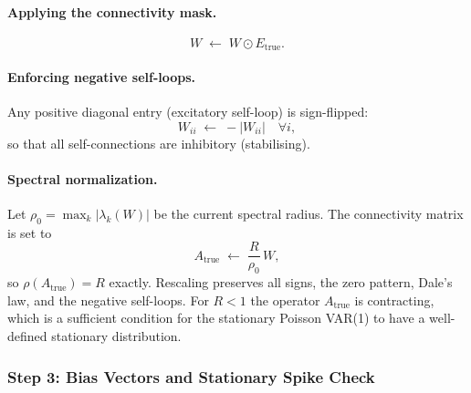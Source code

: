 \documentclass[11pt]{article}
\begin{document}
\paragraph{Applying the connectivity mask.}
\begin{equation}
  W \;\leftarrow\; W \odot E_{\text{true}}.
\end{equation}

\paragraph{Enforcing negative self-loops.}
Any positive diagonal entry (excitatory self-loop) is sign-flipped:
\begin{equation}
  W_{ii} \;\leftarrow\; -|W_{ii}| \quad \forall i,
\end{equation}
so that all self-connections are inhibitory (stabilising).

\paragraph{Spectral normalization.}
Let $\rho_0 = \max_k |\lambda_k(W)|$ be the current spectral radius.
The connectivity matrix is set to
\begin{equation}
  A_{\text{true}} \;\leftarrow\; \frac{R}{\rho_0}\, W,
  \label{eq:spectral}
\end{equation}
so $\rho(A_{\text{true}}) = R$ exactly.
Rescaling preserves all signs, the zero pattern, Dale's law, and
the negative self-loops.
For $R < 1$ the operator $A_{\text{true}}$ is contracting, which is
a sufficient condition for the stationary Poisson VAR(1) to have a
well-defined stationary distribution.

\subsubsection{Step 3: Bias Vectors and Stationary Spike Check}
\label{sec:bias}
\end{document}
